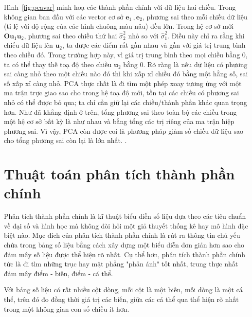\documentclass[../thesis.tex]{subfiles}
\begin{document}
Hình~\ref{fig:pcavar} minh hoạ các thành phần chính với dữ liệu hai chiều.
Trong không gian ban đầu với các vector cơ sở $\mathbf{e}_1\,,\mathbf{e}_2$, phương sai theo mỗi chiều dữ liệu (tỉ lệ với độ rộng của các hình chuông màu nâu) đều lớn. Trong hệ cơ sở mới $\mathbf{O}\mathbf{u}_1\mathbf{u}_2$, phương sai theo chiều thứ hai $\hat{\sigma}_2^2$ nhỏ so với $\hat{\sigma}_1^2$. Điều này chỉ ra rằng khi chiếu dữ liệu lên $\mathbf{u}_2$, ta được các điểm rất gần nhau và gần với giá trị trung bình theo chiều đó. Trong trường hợp này, vì giá trị trung bình theo mọi chiều bằng 0, ta có thể thay thế toạ độ theo chiều $\mathbf{u}_2$ bằng 0. Rõ ràng là nếu dữ liệu có phương sai càng nhỏ theo một chiều nào đó thì khi xấp xỉ chiều đó bằng một hằng số, sai số xấp xỉ càng nhỏ. PCA thực chất là đi tìm một phép xoay tương ứng với một ma trận trực giao sao cho trong hệ toạ độ mới, tồn tại các chiều có phương sai nhỏ có thể được bỏ qua; ta chỉ cần giữ lại các chiều/thành phần khác quan trọng hơn. Như đã khẳng định ở trên, tổng phương sai theo toàn bộ các chiều trong một hệ cơ sở bất kỳ là như nhau và bằng tổng các trị riêng của ma trận hiệp phương sai. Vì vậy, PCA còn được coi là phương pháp giảm số chiều dữ liệu sao cho tổng phương sai còn lại là lớn nhất. \cite{VuHuuTiep}. 














\section{Thuật toán phân tích thành phần chính}

Phân tích thành phần chính là kĩ thuật biểu diễn số liệu dựa theo các tiêu chuẩn về đại số và hình học mà không đòi hỏi một giả thuyết thống kê hay mô hình đặc biệt nào. Mục đích của phân tích thành phần chính là rút ra thông tin chủ yếu chứa trong  bảng số liệu bằng cách xây dựng một biểu diễn đơn giản hơn sao cho đám mây số  liệu được thể hiện rõ nhất. Cụ thể hơn, phân tích thành phần chính tức là đi tìm  những trục hay mặt phẳng "phản ánh" tốt nhất, trung thực nhất đám mây điểm - biến, điểm - cá thể. 

Với bảng số liệu có rất nhiều cột dòng, mỗi cột là một biến, mỗi dòng là một cá  thể, trên đó đo đồng thời giá trị các biến, giữa các cá thể qua thể hiện rõ nhất trong  một không gian con số chiều ít hơn.
\end{document}
